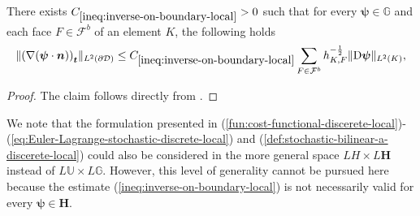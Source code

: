 \documentclass[final,onefignum,onetabnum]{mousaviart}
\begin{document}
	\vspace*{1mm}
	\begin{lemma}
		\label{lem:inverse-on-boundary}
		There exists $C_{\ref{ineq:inverse-on-boundary-local}}>0$ such that for every $\boldsymbol{\psi} \in \mathbb{G}$ and each face $F \in \mathcal{F}^b$ of an element $K$, the following holds
		\begin{equation}
			\label{ineq:inverse-on-boundary-local}
			\lVert \left( \nabla (\boldsymbol{\psi} \cdot \boldsymbol{n}) \right)_{\boldsymbol{t}}  \rVert_{L^2(\partial \mathcal{D})} 
			\leq
			C_{\ref{ineq:inverse-on-boundary-local}}
			\sum_{F \in \mathcal{F}^b}
			h_{K,F}^{-\frac{1}{2}}
			\lVert \mathrm{D} \boldsymbol{\psi} \rVert_{L^2( K)} ,
		\end{equation}
	\end{lemma}
	
	\vspace*{1mm}
	\begin{proof}
		The claim follows directly from \cite[Lemma~12.8]{Ern-Guermond}.
	\end{proof}
	
	\vspace*{1mm}
	\begin{remark}
		\label{rem:discrete-vs.-countiuous-functional-space}
		We note that the formulation presented in (\ref{fun:cost-functional-discerete-local})-(\ref{eq:Euler-Lagrange-stochastic-discrete-local}) and (\ref{def:stochastic-bilinear-a-discerete-local}) could also be considered in the more general space $LH \times L \boldsymbol{H} $ instead of $L \mathbb{U} \times L \mathbb{G}$. 
		However, this level of generality cannot be pursued here because the estimate (\ref{ineq:inverse-on-boundary-local}) is not necessarily valid for every $\boldsymbol{\psi} \in \boldsymbol{H}$.
	\end{remark}
	
\end{document}
